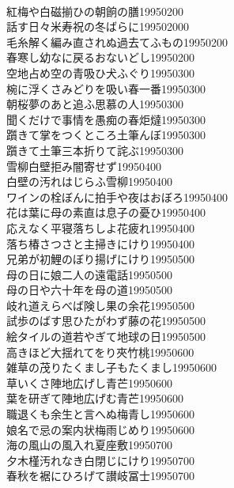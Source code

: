 \begin{multicols}{2}
\\紅梅や白磁揃ひの朝餉の膳\hfill{19950200}
\\話す日々米寿祝の冬ばらに\hfill{199502000}
\\毛糸解く編み直されぬ過去てふもの\hfill{19950200}
\\春寒し幼なに戻るおないどし\hfill{19950200}
\\空地占め空の青吸ひ犬ふぐり\hfill{19950300}
\\椀に浮くさみどりを吸い春一番\hfill{19950300}
\\朝桜夢のあと追ふ思慕の人\hfill{19950300}
\\聞くだけで事情を愚痴の春炬燵\hfill{19950300}
\\躓きて掌をつくところ土筆んぼ\hfill{19950300}
\\躓きて土筆三本折りて詫ぶ\hfill{19950300}
\\雪柳白壁拒み闇寄せず\hfill{19950400}
\\白壁の汚れはじらふ雪柳\hfill{19950400}
\\ワインの栓ぼんに拍手や夜はおぼろ\hfill{19950400}
\\花は葉に母の素直は息子の憂ひ\hfill{19950400}
\\応えなく平寝落ちしよ花疲れ\hfill{19950400}
\\落ち椿さつさと主掃きにけり\hfill{19950400}
\\兄弟が初鯉のぼり揚げにけり\hfill{19950500}
\\母の日に娘二人の遠電話\hfill{19950500}
\\母の日や六十年を母の道\hfill{19950500}
\\岐れ道えらべば険し果の余花\hfill{19950500}
\\試歩のばす思ひたがわず藤の花\hfill{19950500}
\\絵タイルの道若やぎて地球の日\hfill{19950500}
\\高きほど大揺れてをり夾竹桃\hfill{19950600}
\\雑草の茂りたくまし子もたくまし\hfill{19950600}
\\草いくさ陣地広げし青芒\hfill{19950600}
\\葉を研ぎて陣地広げむ青芒\hfill{19950600}
\\職退くも余生と言へぬ梅青し\hfill{19950600}
\\娘名で忌の案内状梅雨じめり\hfill{19950600}
\\海の風山の風入れ夏座敷\hfill{19950700}
\\夕木槿汚れなき白閉じにけり\hfill{19950700}
\\春秋を裾にひろげて讃岐冨士\hfill{19950700}

\end{multicols}
